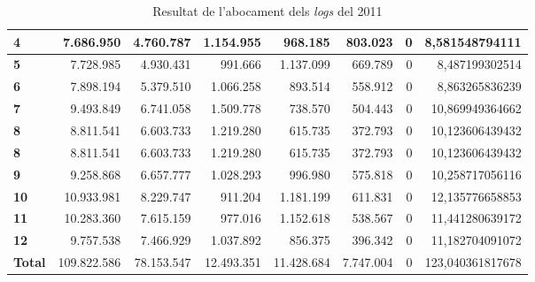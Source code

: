 \begin{table}[h!]
\begin{adjustbox}{width=1.5\textwidth, center}
\begin{tabular}{|l|r|r|r|r|r|r|r|}
            \textbf{4}     & 7.686.950   & 4.760.787  & 1.154.955  & 968.185    & 803.023   & 0 & 8,581548794111   \\
            \midrule
            \textbf{5}     & 7.728.985   & 4.930.431  & 991.666    & 1.137.099  & 669.789   & 0 & 8,487199302514   \\
            \textbf{6}     & 7.898.194   & 5.379.510  & 1.066.258  & 893.514    & 558.912   & 0 & 8,863265836239   \\
            \textbf{7}     & 9.493.849   & 6.741.058  & 1.509.778  & 738.570    & 504.443   & 0 & 10,869949364662  \\
            \textbf{8}     & 8.811.541   & 6.603.733  & 1.219.280  & 615.735    & 372.793   & 0 & 10,123606439432  \\
            \midrule
            \textbf{8}     & 8.811.541   & 6.603.733  & 1.219.280  & 615.735    & 372.793   & 0 & 10,123606439432  \\
            \textbf{9}     & 9.258.868   & 6.657.777  & 1.028.293  & 996.980    & 575.818   & 0 & 10,258717056116  \\
            \textbf{10}    & 10.933.981  & 8.229.747  & 911.204    & 1.181.199  & 611.831   & 0 & 12,135776658853  \\
            \textbf{11}    & 10.283.360  & 7.615.159  & 977.016    & 1.152.618  & 538.567   & 0 & 11,441280639172  \\
            \textbf{12}    & 9.757.538   & 7.466.929  & 1.037.892  & 856.375    & 396.342   & 0 & 11,182704091072  \\
            \midrule
            \textbf{Total} & 109.822.586 & 78.153.547 & 12.493.351 & 11.428.684 & 7.747.004 & 0 & 123,040361817678 \\
            \bottomrule
        \end{tabular}
    \end{adjustbox}
    \caption{Resultat de l'abocament dels \textit{logs} del 2011}
    \label{tab:logs-table-2011}
\end{table}
